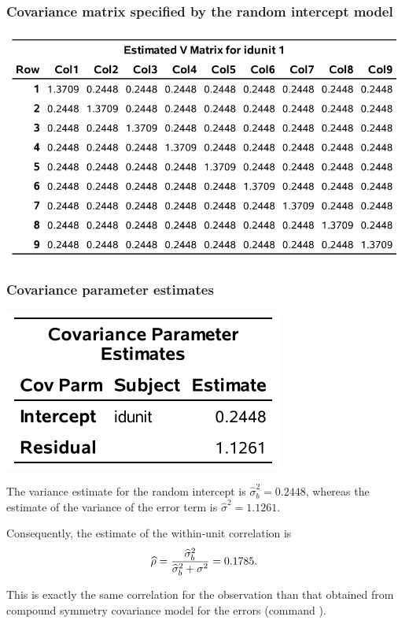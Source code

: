 \documentclass{beamer}
\begin{document}
\begin{frame}[fragile]
\frametitle{Covariance matrix specified by the random intercept model}
\begin{center}
\includegraphics[width = 0.9\linewidth]{img/c6/slides7-e11}

\end{center}
\end{frame}

% 

\begin{frame}[fragile]
\frametitle{Covariance parameter estimates}
\begin{center}
\includegraphics[width = 0.4\linewidth]{img/c6/slides7-e12}
\end{center}
\bi
\item The variance estimate for the random intercept is
$\hat{\sigma}^2_b=0.2448$, whereas the estimate of the variance of the error term is
$\hat{\sigma}^2= 1.1261$.
\item Consequently, the estimate of the within-unit correlation is
\begin{align*}
\hat{\rho}=\frac{\hat{\sigma}^2_b}{\hat{\sigma}^2_b+\sigma^2_{\vphantom{b}}}=0.1785.
\end{align*}
\item This is exactly the same correlation for the observation than that obtained from compound symmetry covariance model for the errors (command ).
\ei
\end{frame}
\end{document}
